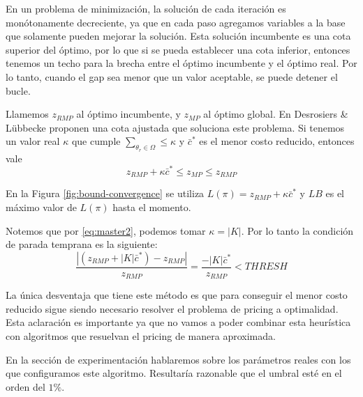 En un problema de minimización, la solución de cada iteración es monótonamente decreciente, ya que en cada paso agregamos variables a la base que solamente pueden mejorar la solución. Esta solución incumbente es una cota superior del óptimo, por lo que si se pueda establecer una cota inferior, entonces tenemos un techo para la brecha entre el óptimo incumbente y el óptimo real. Por lo tanto, cuando el gap sea menor que un valor aceptable, se puede detener el bucle.

Llamemos $z_{RMP}$ al óptimo incumbente, y $z_{MP}$ al óptimo global. En \cite{desrosiers2005primer} Desrosiers \& Lübbecke proponen una cota ajustada que soluciona este problema. Si tenemos un valor real $\kappa$ que cumple $\sum_{\theta_r \in \Omega} \leq \kappa$ y $\bar{c}^{*}$ es el menor costo reducido, entonces vale
\begin{equation}
    z_{RMP} + \kappa \bar{c}^{*} \leq z_{MP} \leq z_{RMP}
\end{equation}

En la Figura \ref{fig:bound-convergence} se utiliza $L(\pi) = z_{RMP} + \kappa \bar{c}^{*}$ y $LB$ es el máximo valor de $L(\pi)$ hasta el momento.

Notemos que por \ref{eq:master2}, podemos tomar $\kappa = |K|$. Por lo tanto la condición de parada temprana es la siguiente:
\begin{equation}
     \frac{|(z_{RMP} + |K| \bar{c}^{*}) - z_{RMP}|}{z_{RMP}} = \frac{-|K| \bar{c}^{*}}{z_{RMP}}  < THRESH
\end{equation}

La única desventaja que tiene este método es que para conseguir el menor costo reducido sigue siendo necesario resolver el problema de pricing a optimalidad. Esta aclaración es importante ya que no vamos a poder combinar esta heurística con algoritmos que resuelvan el pricing de manera aproximada.

En la sección de experimentación hablaremos sobre los parámetros reales con los que configuramos este algoritmo. Resultaría razonable que el umbral esté en el orden del $1\%$.
